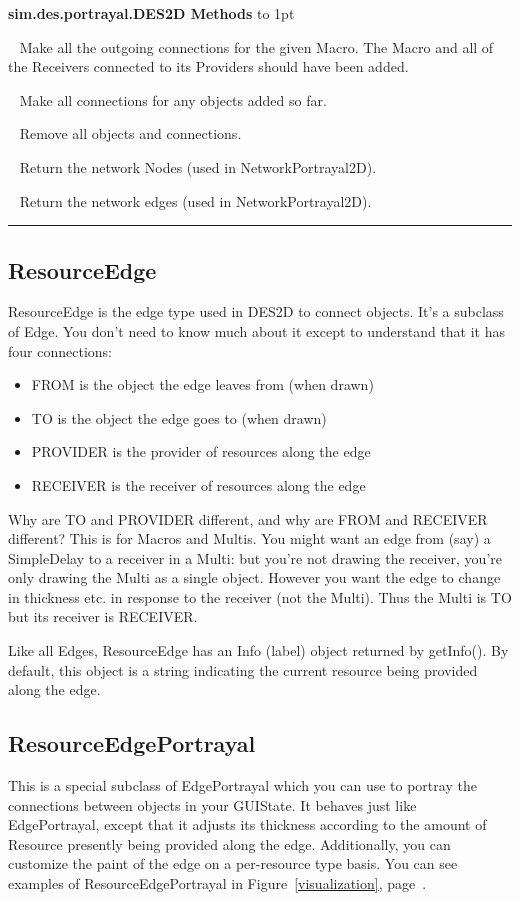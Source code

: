 \documentclass[twoside,10pt]{article}
\newcommand\class[1]{\index{Classes!{#1}}\textsf{#1}}
\newcommand*{\xfill}[1][0pt]{%
	\cleaders
		\hbox to 1pt{\hss
			\raisebox{#1}{\rule{1.2pt}{0.4pt}}%
			\hss}\hfill}
\newenvironment{methods}[1]{
\vspace{1.0em}\noindent\textsf{\textbf{#1 Methods}}\quad \xfill[0.5ex]
\vspace{-0.25em}
\begin{description}
\small}
{\end{description}\hrule\vspace{1.5em}}
\newcommand{\mthd}[1]{\item[{\sf #1}]~\newline}
\begin{document}
\begin{methods}{\class{sim.des.portrayal.DES2D}}
\mthd{public ArrayList\(<\)ResourceEdge\(>\) connect(Macro macroProvider)}
Make all the outgoing connections for the given Macro.  The Macro and all of the Receivers connected to its Providers should have been added.
\mthd{public ArrayList\(<\)ResourceEdge\(>\) connectAll()}
Make all connections for any objects added so far.
\mthd{public void clear()}
Remove all objects and connections.
\mthd{public Continuous2D getNodes()}
Return the network Nodes (used in NetworkPortrayal2D).
\mthd{public Network getEdges()}
Return the network edges (used in NetworkPortrayal2D).
\end{methods}

\subsection{ResourceEdge}

ResourceEdge is the edge type used in DES2D to connect objects.  It's a subclass of Edge.  You don't need to know much about it except to understand that it has four connections:

\begin{itemize}
\item FROM is the object the edge leaves from (when drawn)
\item TO is the object the edge goes to (when drawn)
\item PROVIDER is the provider of resources along the edge
\item RECEIVER is the receiver of resources along the edge
\end{itemize}

Why are TO and PROVIDER different, and why are FROM and RECEIVER different?  This is for Macros and Multis.  You might want an edge from (say) a SimpleDelay to a receiver in a Multi: but you're not drawing the receiver, you're only drawing the Multi as a single object.  However you want the edge to change in thickness etc. in response to the receiver (not the Multi).  Thus the Multi is TO but its receiver is RECEIVER.

Like all Edges, ResourceEdge has an Info (label) object returned by getInfo(). By default, this object is a string indicating the current resource being provided along the edge.

\subsection{ResourceEdgePortrayal}

This is a special subclass of EdgePortrayal which you can use to portray the connections between objects in your GUIState.  It behaves just like EdgePortrayal, except that it adjusts its thickness according to the amount of Resource presently being provided along the edge.  Additionally, you can customize the paint of the edge on a per-resource type basis.  You can see examples of ResourceEdgePortrayal in Figure~\ref{visualization}, page~\pageref{visualization}.
\end{document}
